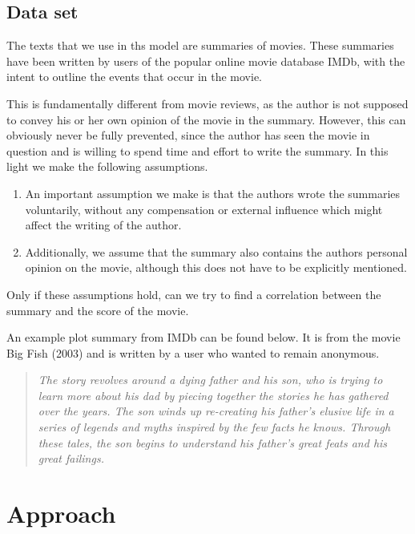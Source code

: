 \documentclass[a4paper,10pt]{article}
\begin{document}

\subsection{Data set}
The texts that we use in ths model are summaries of movies.
These summaries have been written by users of the popular online movie database IMDb, with the intent to outline the events that occur in the movie.

This is fundamentally different from movie reviews, as the author is not supposed to convey his or her own opinion of the movie in the summary.
However, this can obviously never be fully prevented, since the author has seen the movie in question and is willing to spend time and effort to write the summary.
In this light we make the following assumptions.

\begin{enumerate}
  \item An important assumption we make is that the authors wrote the summaries voluntarily, without any compensation or external influence which might affect the writing of the author.
  \item Additionally, we assume that the summary also contains the authors personal opinion on the movie, although this does not have to be explicitly mentioned.
\end{enumerate}
Only if these assumptions hold, can we try to find a correlation between the summary and the score of the movie.

An example plot summary from IMDb can be found below. 
It is from the movie Big Fish (2003) and is written by a user who wanted to remain anonymous.
\begin{quotation}
  \emph{The story revolves around a dying father and his son, who is trying to learn more about his dad by piecing together the stories he has gathered over the years.
  The son winds up re-creating his father's elusive life in a series of legends and myths inspired by the few facts he knows.
  Through these tales, the son begins to understand his father's great feats and his great failings.}
\end{quotation}

\section{Approach}
\label{sec:approach}
\end{document}
